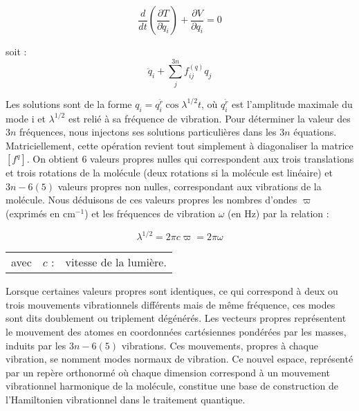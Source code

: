 \begin{equation}
	\frac{d}{dt}\left(\frac{\partial T}{\partial \dot{q}_i}\right) + \frac{\partial V}{\partial q_i} = 0
\end{equation}

\noindent soit : 
\begin{equation}
\ddot{q}_i + \sum^{3n}_j f^{(q)}_{ij} q_j
\end{equation}

Les solutions sont de la forme $q_i = q_i^{\check{r}} \cos \lambda^{1/2} t$, où $q_i^{\check{r}}$ est l'amplitude maximale du mode i et $\lambda^{1/2}$ est relié à sa fréquence de vibration. Pour déterminer la valeur des $3n$ fréquences, nous injectons ses solutions particulières dans les $3n$ équations. Matriciellement, cette opération revient tout simplement à diagonaliser la matrice $\left[ f^q\right]$.
On obtient 6 valeurs propres nulles qui correspondent aux trois translations et trois rotations de la molécule (deux rotations si la molécule est linéaire) et $3n-6(5)$ valeurs propres non nulles, correspondant aux vibrations de la molécule. Nous déduisons de ces valeurs propres les nombres d'ondes $\varpi$ (exprimés en cm$^{-1}$) et les fréquences de vibration $\omega$ (en Hz) par la relation :

\begin{equation}
	\lambda^{1/2} = 2\pi c\varpi = 2\pi\omega
\label{varpi}
\end{equation}
\begin{flushleft}
\begin{tabular}{@{}lrp{10cm}}
avec & $c$ : & vitesse de la lumière. 
\end{tabular}
\end{flushleft}

Lorsque certaines valeurs propres sont identiques, ce qui correspond à deux ou trois mouvements vibrationnels différents mais de même fréquence, ces modes sont dits doublement ou triplement dégénérés.
Les vecteurs propres représentent le mouvement des atomes en coordonnées cartésiennes pondérées par les masses, induits par les $3n-6(5)$ vibrations. Ces mouvements, propres à chaque vibration, se nomment modes normaux de vibration. Ce nouvel espace, représenté par un repère orthonormé où chaque dimension correspond à un mouvement vibrationnel harmonique de la molécule, constitue une base de construction de l'Hamiltonien vibrationnel dans le traitement quantique.



